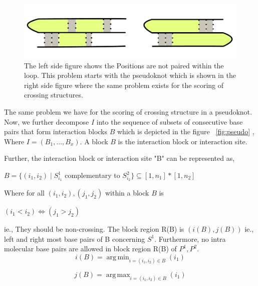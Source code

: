 \documentclass[twoside,a4paper]{report}
\DeclareMathOperator*{\argmin}{arg\,min}
\DeclareMathOperator*{\argmax}{arg\,max}
\begin{document}
 		\begin{figure}[tb]
 		\includegraphics[width=1.0\linewidth]{pseudoknot.pdf}
 		\centering
 		\caption{ The left side figure shows the Positions are not paired within the loop. This problem starts with the pseudoknot which is shown in the right side figure where the same problem exists for the scoring of crossing structures. }
 		\label{fig:pseudoknot}
 	\end{figure}
 	
 	The same problem we have for the scoring of crossing structure in a pseudoknot.\\
 	Now, we further decompose $I$ into the sequence of subsets of consecutive base pairs that form interaction blocks $B$ which is depicted in the figure ~\ref{fig:pseudo} , Where $ I = (B_1 ,..., B_x)$. A block $B$ is the interaction block or interaction site.
 
 	Further, the interaction block or interaction site "B" can be represented as,
 	
 	\begin{center}
 	 $B = \{ (i_1 , i_2)  \mid  S^1_{i_1}$ complementary to $ S^2_{i_2} \} \subseteq [ 1, n_1] * [1 , n_2] $
 	\end{center}
 	
 	Where for all $(i_1 ,i_2) ,(j_1, j_2) $ within a block $B$ is 
 	
 	\begin{center}
 		$(i_1 < i_2) \iff  (j_1 > j_2)$
 	\end{center}
 	
 	ie., They should be non-crossing.  The block region R(B) is $(i(B) , j(B))$ ie., left and right most base pairs of B concerning $S^1$. Furthermore, no intra molecular base pairs are allowed in block region R(B) of $P^1 , P^2$.\\
 	
 	\begin{equation*}
 		i(B) = \argmin_{i = (i_1, i_2 ) \in B } (i_1)
 	\end{equation*}
 
 	\begin{equation*}
 			j(B) = \argmax_{i = (i_1, i_2 ) \in B} (i_1)
 	\end{equation*}
 	
\end{document}
